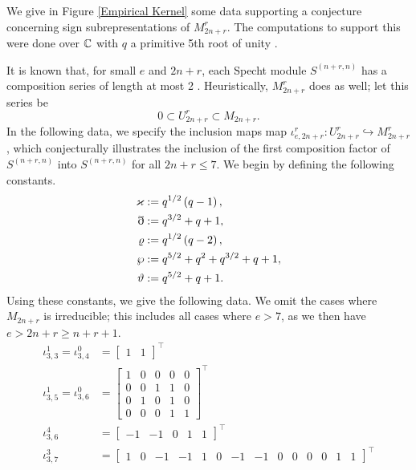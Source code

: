 \documentclass{amsart}
\begin{document}
We give in Figure \ref{Empirical Kernel} some data supporting a conjecture concerning sign subrepresentations of $M_{2n + r}^r$.
The computations to support this were done over $\mathbb{C}$ with $q$ a primitive 5th root of unity \cite{Github}.

It is known that, for small $e$ and $2n + r$, each Specht module $S^{(n+r,n)}$ has a composition series of length at most 2 \cite[Appendix B]{Mathas-book}.
Heuristically, $M_{2n + r}^r$ does as well;
let this series be
\[
  0 \subset U_{2n + r}^r \subset M_{2n + r}.
\]
In the following data, we specify the inclusion maps map $\iota_{e,2n+r}^r:U_{2n + r}^r \hookrightarrow M_{2n + r}^r $, which conjecturally illustrates the inclusion of the first composition factor of $S^{(n+r,n)}$ into $S^{(n+r,n)}$ for all $2n + r \leq 7$.
We begin by defining the following constants.
\def\qqo{\varkappa}
\def\tto{\eth}
\def\vtv{\varrho}
\def\fft{\wp}
\def\fto{\vartheta}
\setcounter{MaxMatrixCols}{20}
\begin{align*}
  \qqo &:= q^{1/2}\prn{q - 1},\\
  \tto &:= q^{3/2} + q + 1,\\
  \vtv &:= q^{1/2}\prn{q - 2},\\
  \fft &:= q^{5/2} + q^2 + q^{3/2} + q + 1,\\ 
  \fto &:= q^{5/2} + q + 1.
\end{align*}
Using these constants, we give the following data.
We omit the cases where $M_{2n + r}$ is irreducible;
this includes all cases where $e > 7$, as we then have $e > 2n + r \geq n + r + 1$.
\begin{align*} 
  \iota_{3,3}^1 = \iota_{3,4}^0 &=  
\begin{bmatrix}
  1 & 1
\end{bmatrix}^\intercal\\
\iota_{3,5}^1 = \iota_{3,6}^0&=  
\begin{bmatrix}
  1 & 0 & 0 & 0 & 0\\
  0 & 0 & 1 & 1 & 0\\
  0 & 1 & 0 & 1 & 0\\
  0 & 0 & 0 & 1 & 1
\end{bmatrix}^\intercal\\
\iota_{3,6}^4&=  
\begin{bmatrix}
  -1 & -1 & 0 & 1 & 1
\end{bmatrix}^\intercal\\
\iota_{3,7}^3&=  
\begin{bmatrix}
 1 & 0 &-1 &-1 & 1 & 0 & -1 & -1 & 0 & 0 & 0 & 0 & 1 & 1
\end{bmatrix}^\intercal
\end{align*}
\end{document}
